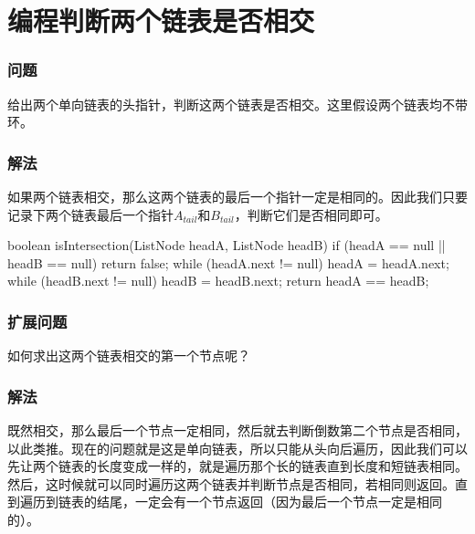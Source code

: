 \section{编程判断两个链表是否相交} %
\label{sec:linkedlist-intersection}


\subsubsection{问题}
给出两个单向链表的头指针，判断这两个链表是否相交。这里假设两个链表均不带环。

\subsubsection{解法}
如果两个链表相交，那么这两个链表的最后一个指针一定是相同的。因此我们只要记录下两个链表最后一个指针$A_{tail}$和$B_{tail}$，判断它们是否相同即可。

\begin{Codex}[label={[$O(L)+O(0)$]Chap03_06_LinkedListIntersection.java}]
boolean isIntersection(ListNode headA, ListNode headB) {
	if (headA == null || headB == null) {
		return false;
	}
	while (headA.next != null) {
		headA = headA.next;
	}
	while (headB.next != null) {
		headB = headB.next;
	}
	return headA == headB;
}
\end{Codex}

\subsubsection{扩展问题}
如何求出这两个链表相交的第一个节点呢？

\subsubsection{解法}
既然相交，那么最后一个节点一定相同，然后就去判断倒数第二个节点是否相同，以此类推。现在的问题就是这是单向链表，所以只能从头向后遍历，因此我们可以先让两个链表的长度变成一样的，就是遍历那个长的链表直到长度和短链表相同。
然后，这时候就可以同时遍历这两个链表并判断节点是否相同，若相同则返回。直到遍历到链表的结尾，一定会有一个节点返回（因为最后一个节点一定是相同的）。

